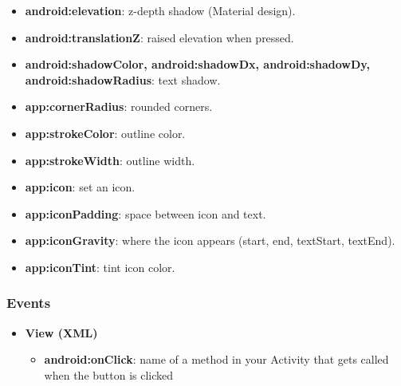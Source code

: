 \documentclass{report}
\begin{document}
\begin{itemize}
\begin{itemize}
                \item \textbf{android:elevation}: z-depth shadow (Material design).
                \item \textbf{android:translationZ}: raised elevation when pressed.
                \item \textbf{android:shadowColor, android:shadowDx, android:shadowDy, android:shadowRadius}: text shadow.
                \item \textbf{app:cornerRadius}: rounded corners.
                \item \textbf{app:strokeColor}: outline color.
                \item \textbf{app:strokeWidth}: outline width.
                \item \textbf{app:icon}: set an icon.
                \item \textbf{app:iconPadding}: space between icon and text.
                \item \textbf{app:iconGravity}: where the icon appears (start, end, textStart, textEnd).
                \item \textbf{app:iconTint}: tint icon color.
            \end{itemize}
    \end{itemize}

    \pagebreak 
    \subsubsection{Events}
    \begin{itemize}
        \item \textbf{View (XML)}
            \begin{itemize}
                \item \textbf{android:onClick}: name of a method in your Activity that gets called when the button is clicked
            \end{itemize}
    \end{itemize}


    \pagebreak 
\end{document}
